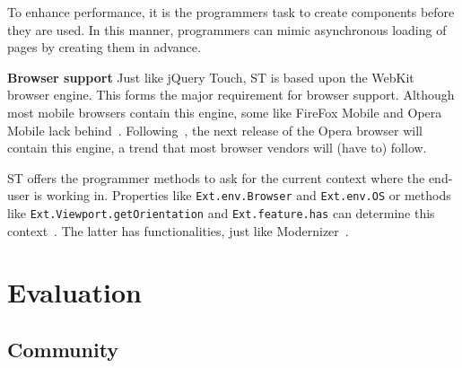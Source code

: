 \documentclass[a4paper]{artikel3}
\newcommand{\code}[1]{\texttt{#1}}
\renewcommand{\paragraph}[1]{{\bf #1} }
\begin{document}
To enhance performance,  it is the programmers task to create components before they are used.  In this manner,  programmers can mimic asynchronous loading of pages by creating them in advance.



\paragraph{Browser support}
Just like jQuery Touch,  ST is based upon the WebKit browser engine.  This forms the major requirement for browser support.  Although most mobile browsers contain this engine,  some like FireFox Mobile and Opera Mobile lack behind~\cite{JohnEClark2012}.  Following~\cite{Wokke2013}, the next release of the Opera browser will contain this engine,  a trend that most browser vendors will (have to) follow.

ST offers the programmer methods to ask for the current context where the end-user is working in.  Properties like \code{Ext.env.Browser} and \code{Ext.env.OS} or methods like \code{Ext.Viewport.getOrientation} and \code{Ext.feature.has} can determine this context~\cite{JohnEClark2012}.  The latter has functionalities,  just like Modernizer~\cite{Modernizr2012}.  


\section{Evaluation}

\subsection{Community} %
\label{sec:community}


\end{document}
